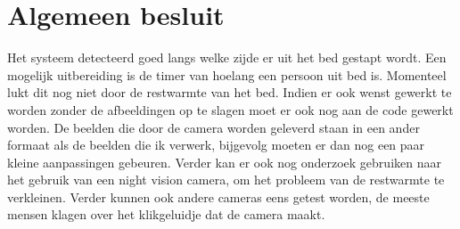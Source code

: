 \chapter{Algemeen besluit}
Het systeem detecteerd goed langs welke zijde er uit het bed gestapt wordt. Een mogelijk uitbereiding is de timer van hoelang een persoon uit bed is. Momenteel lukt dit nog niet door de restwarmte van het bed. Indien er ook wenst gewerkt te worden zonder de afbeeldingen op te slagen moet er ook nog aan de code gewerkt worden. De beelden die door de camera worden geleverd staan in een ander formaat als de beelden die ik verwerk, bijgevolg moeten er dan nog een paar kleine aanpassingen gebeuren. Verder kan er ook nog onderzoek gebruiken naar het gebruik van een night vision camera, om het probleem van de restwarmte te verkleinen. Verder kunnen ook andere cameras eens getest worden, de meeste mensen klagen over het klikgeluidje dat de camera maakt.